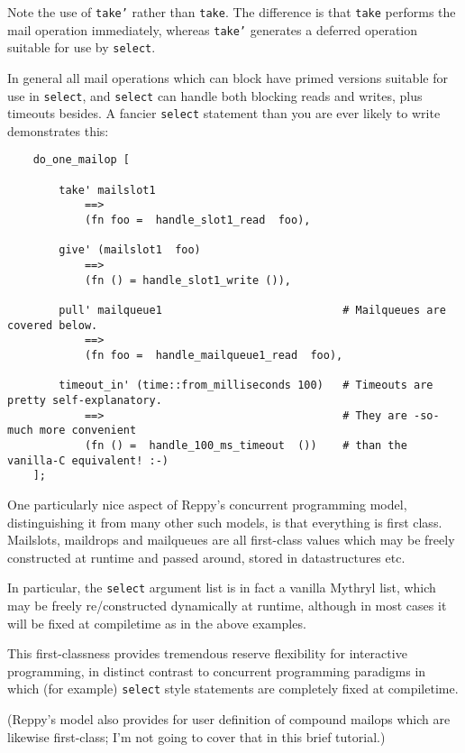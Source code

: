 \begin{itemize}
\begin{itemize}
Note the use of {\tt take'} rather than {\tt take}. 
The difference is that {\tt take} performs the 
mail operation immediately, whereas {\tt take'} 
generates a deferred operation suitable for 
use by {\tt select}.

In general all mail operations which can 
block have primed versions suitable for 
use in {\tt select}, and {\tt select} can handle 
both blocking reads and writes, plus timeouts 
besides.  A fancier {\tt select} statement than 
you are ever likely to write demonstrates this: 

\begin{verbatim}
    do_one_mailop [

        take' mailslot1
            ==>
            (fn foo =  handle_slot1_read  foo),

        give' (mailslot1  foo)
            ==>
            (fn () = handle_slot1_write ()),

        pull' mailqueue1                            # Mailqueues are covered below.
            ==>
            (fn foo =  handle_mailqueue1_read  foo),

        timeout_in' (time::from_milliseconds 100)   # Timeouts are pretty self-explanatory.
            ==>                                     # They are -so- much more convenient
            (fn () =  handle_100_ms_timeout  ())    # than the vanilla-C equivalent! :-)
    ];
\end{verbatim}


One particularly nice aspect of Reppy's concurrent 
programming model, distinguishing it from many other 
such models, is that everything is first class. 
Mailslots, maildrops and mailqueues are all first-class 
values which may be freely constructed at runtime and 
passed around, stored in datastructures etc. 

In particular, the {\tt select} argument list is in fact 
a vanilla Mythryl list, which may be freely re/constructed 
dynamically at runtime, although in most cases it will 
be fixed at compiletime as in the above examples. 

This first-classness provides tremendous reserve flexibility 
for interactive programming, in distinct contrast to 
concurrent programming paradigms in which (for example) 
{\tt select} style statements are completely fixed at compiletime.

(Reppy's model also provides for user definition of compound 
mailops which are likewise first-class;  I'm not going to 
cover that in this brief tutorial.) 



\end{itemize}
\end{itemize}
